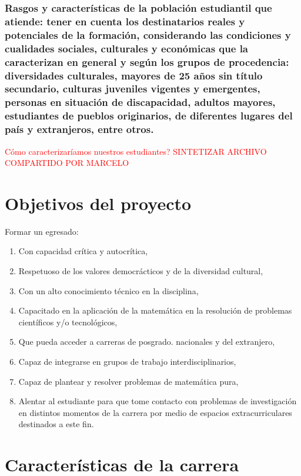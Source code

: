 \documentclass[a4paper, 12pt]{article}
\begin{document}
\subsubsection{Rasgos y características de la población estudiantil que atiende: tener en cuenta los destinatarios reales y potenciales de la formación, considerando las condiciones y cualidades sociales, culturales y económicas que la caracterizan en general y según los grupos de procedencia: diversidades culturales, mayores de 25 años sin título secundario, culturas juveniles vigentes y emergentes, personas en situación de discapacidad, adultos mayores, estudiantes de pueblos originarios, de diferentes lugares del país y extranjeros, entre otros.}

\textcolor{red}{Cómo caracterizaríamos nuestros estudiantes? SINTETIZAR  ARCHIVO COMPARTIDO POR MARCELO}

\section{Objetivos del proyecto}


Formar un egresado:

\begin{enumerate}

 \item Con capacidad crítica y autocrítica,
 \item Respetuoso de los valores democrácticos y de la diversidad cultural,  
  \item Con un alto conocimiento técnico en la disciplina,
 \item Capacitado en la aplicación de la matemática en la
resolución de problemas científicos y/o tecnológicos,
\item Que pueda acceder a carreras de posgrado.
nacionales y del extranjero, 
\item Capaz de integrarse en grupos de trabajo interdisciplinarios,
\item Capaz de plantear y resolver problemas de matemática pura,
\item Alentar al estudiante para que tome contacto con problemas de
    investigación en distintos momentos de la carrera por medio de espacios extracurriculares destinados a este fin.
\end{enumerate}







\section{Características de la carrera}
\end{document}
